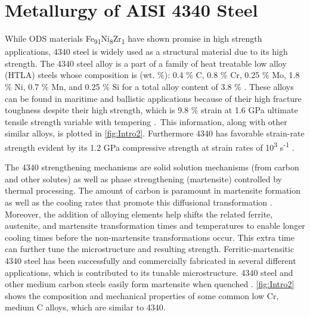 	
	


\section*{Metallurgy of AISI 4340 Steel}

	While ODS materials Fe\textsubscript{91}Ni\textsubscript{8}Zr\textsubscript{1 }have shown promise in high strength applications, 4340 steel is widely used as a structural material due to its high strength. The 4340 steel alloy is a part of a family of heat treatable low alloy (HTLA) steels whose composition is (wt. $\%$): 0.4 $\%$  C, 0.8 $\%$  Cr, 0.25 $\%$  Mo, 1.8 $\%$  Ni, 0.7 $\%$  Mn, and 0.25 $\%$  Si for a total alloy content of 3.8 $\%$  \cite{RN2268}. These alloys can be found in maritime and ballistic applications because of their high fracture toughness despite their high strength, which is 9.8 $\%$  strain at 1.6 GPa ultimate tensile strength variable with tempering \cite{RN1418}.\ This information, along with other similar alloys, is plotted in \ref{fig:Intro2}.  Furthermore 4340 has favorable strain-rate strength evident by its 1.2 GPa compressive strength at strain rates of 10\textsuperscript{3} s\textsuperscript{-1} \cite{RN2270, RN674}. 
	
	The 4340 strengthening mechanisms are solid solution mechanisms (from carbon and other solutes) as well as phase strengthening (martensite) controlled by thermal processing. The amount of carbon is paramount in martensite formation as well as the cooling rates that promote this diffusional transformation \cite{RN691}. Moreover, the addition of alloying elements help shifts the related ferrite, austenite, and martensite transformation times and temperatures to enable longer cooling times before the non-martensite transformations occur. This extra time can further tune the microstructure and resulting strength. Ferritic-martensitic 4340 steel has been successfully and commercially fabricated in several different applications, which is contributed to its tunable microstructure. 4340 steel and other medium carbon steels easily form martensite when quenched \cite{RN1358}. \ref{fig:Intro2} shows the composition and mechanical properties of some common low Cr, medium C alloys, which are similar to 4340. 
	
	
	
